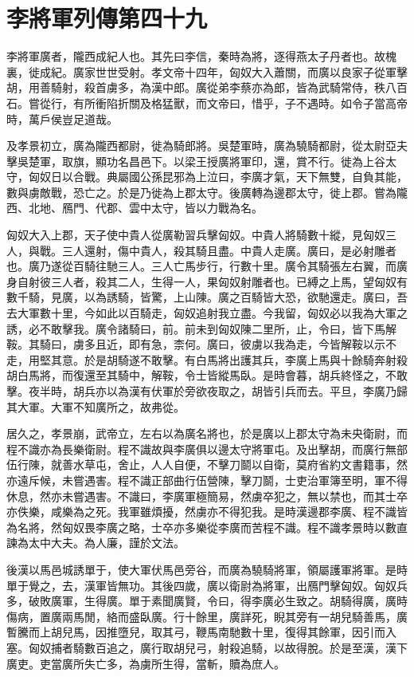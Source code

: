 \chapter{李將軍列傳第四十九}

李將軍廣者，隴西成紀人也。其先曰李信，秦時為將，逐得燕太子丹者也。故槐裏，徙成紀。廣家世世受射。孝文帝十四年，匈奴大入蕭關，而廣以良家子從軍擊胡，用善騎射，殺首虜多，為漢中郎。廣從弟李蔡亦為郎，皆為武騎常侍，秩八百石。嘗從行，有所衝陷折關及格猛獸，而文帝曰，惜乎，子不遇時。如令子當高帝時，萬戶侯豈足道哉。

及孝景初立，廣為隴西都尉，徙為騎郎將。吳楚軍時，廣為驍騎都尉，從太尉亞夫擊吳楚軍，取旗，顯功名昌邑下。以梁王授廣將軍印，還，賞不行。徙為上谷太守，匈奴日以合戰。典屬國公孫昆邪為上泣曰，李廣才氣，天下無雙，自負其能，數與虜敵戰，恐亡之。於是乃徙為上郡太守。後廣轉為邊郡太守，徙上郡。嘗為隴西、北地、鴈門、代郡、雲中太守，皆以力戰為名。

匈奴大入上郡，天子使中貴人從廣勒習兵擊匈奴。中貴人將騎數十縱，見匈奴三人，與戰。三人還射，傷中貴人，殺其騎且盡。中貴人走廣。廣曰，是必射雕者也。廣乃遂從百騎往馳三人。三人亡馬步行，行數十里。廣令其騎張左右翼，而廣身自射彼三人者，殺其二人，生得一人，果匈奴射雕者也。已縛之上馬，望匈奴有數千騎，見廣，以為誘騎，皆驚，上山陳。廣之百騎皆大恐，欲馳還走。廣曰，吾去大軍數十里，今如此以百騎走，匈奴追射我立盡。今我留，匈奴必以我為大軍之誘，必不敢擊我。廣令諸騎曰，前。前未到匈奴陳二里所，止，令曰，皆下馬解鞍。其騎曰，虜多且近，即有急，柰何。廣曰，彼虜以我為走，今皆解鞍以示不走，用堅其意。於是胡騎遂不敢擊。有白馬將出護其兵，李廣上馬與十餘騎奔射殺胡白馬將，而復還至其騎中，解鞍，令士皆縱馬臥。是時會暮，胡兵終怪之，不敢擊。夜半時，胡兵亦以為漢有伏軍於旁欲夜取之，胡皆引兵而去。平旦，李廣乃歸其大軍。大軍不知廣所之，故弗從。

居久之，孝景崩，武帝立，左右以為廣名將也，於是廣以上郡太守為未央衛尉，而程不識亦為長樂衛尉。程不識故與李廣俱以邊太守將軍屯。及出擊胡，而廣行無部伍行陳，就善水草屯，舍止，人人自便，不擊刀鬬以自衛，莫府省約文書籍事，然亦遠斥候，未嘗遇害。程不識正部曲行伍營陳，擊刀鬬，士吏治軍簿至明，軍不得休息，然亦未嘗遇害。不識曰，李廣軍極簡易，然虜卒犯之，無以禁也，而其士卒亦佚樂，咸樂為之死。我軍雖煩擾，然虜亦不得犯我。是時漢邊郡李廣、程不識皆為名將，然匈奴畏李廣之略，士卒亦多樂從李廣而苦程不識。程不識孝景時以數直諫為太中大夫。為人廉，謹於文法。

後漢以馬邑城誘單于，使大軍伏馬邑旁谷，而廣為驍騎將軍，領屬護軍將軍。是時單于覺之，去，漢軍皆無功。其後四歲，廣以衛尉為將軍，出鴈門擊匈奴。匈奴兵多，破敗廣軍，生得廣。單于素聞廣賢，令曰，得李廣必生致之。胡騎得廣，廣時傷病，置廣兩馬閒，絡而盛臥廣。行十餘里，廣詳死，睨其旁有一胡兒騎善馬，廣暫騰而上胡兒馬，因推墮兒，取其弓，鞭馬南馳數十里，復得其餘軍，因引而入塞。匈奴捕者騎數百追之，廣行取胡兒弓，射殺追騎，以故得脫。於是至漢，漢下廣吏。吏當廣所失亡多，為虜所生得，當斬，贖為庶人。

